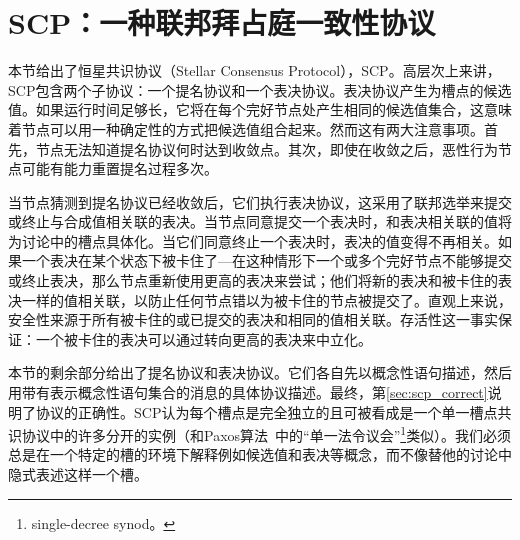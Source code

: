\section{SCP：一种联邦拜占庭一致性协议}\label{sec:scp}

本节给出了恒星共识协议（Stellar Consensus Protocol），SCP。高层次上来讲，SCP包含两个子协议：一个提名协议和一个表决协议。表决协议产生为槽点的候选值。如果运行时间足够长，它将在每个完好节点处产生相同的候选值集合，这意味着节点可以用一种确定性的方式把候选值组合起来。然而这有两大注意事项。首先，节点无法知道提名协议何时达到收敛点。其次，即使在收敛之后，恶性行为节点可能有能力重置提名过程多次。

当节点猜测到提名协议已经收敛后，它们执行表决协议，这采用了联邦选举来提交或终止与合成值相关联的表决。当节点同意提交一个表决时，和表决相关联的值将为讨论中的槽点具体化。当它们同意终止一个表决时，表决的值变得不再相关。如果一个表决在某个状态下被卡住了---在这种情形下一个或多个完好节点不能够提交或终止表决，那么节点重新使用更高的表决来尝试；他们将新的表决和被卡住的表决一样的值相关联，以防止任何节点错以为被卡住的节点被提交了。直观上来说，安全性来源于所有被卡住的或已提交的表决和相同的值相关联。存活性这一事实保证：一个被卡住的表决可以通过转向更高的表决来中立化。

本节的剩余部分给出了提名协议和表决协议。它们各自先以概念性语句描述，然后用带有表示概念性语句集合的消息的具体协议描述。最终，第\ref{sec:scp_correct}说明了协议的正确性。SCP认为每个槽点是完全独立的且可被看成是一个单一槽点共识协议中的许多分开的实例（和Paxos算法~\cite{Lamport:1998:PP:279227.279229}中的``单一法令议会''\footnote{single-decree synod。}类似）。我们必须总是在一个特定的槽的环境下解释例如候选值和表决等概念，而不像替他的讨论中隐式表述这样一个槽。



